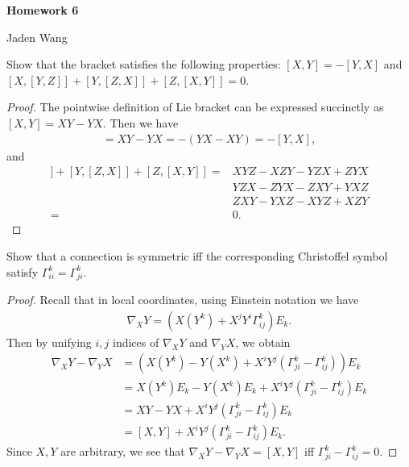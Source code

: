 \documentclass[12pt]{article}
\begin{document}
\centerline {\textsf{\textbf{\LARGE{Homework 6}}}}
\centerline {Jaden Wang}
\vspace{.15in}
\begin{problem}[LN15 0.4]
	Show that the bracket satisfies the following properties: $ [X,Y] = - [Y,X]$ and  $ [X,[Y,Z]] + [Y,[Z,X]] + [Z,[X,Y]] =0$.
\end{problem}
\begin{proof}
	The pointwise definition of Lie bracket can be expressed succinctly as $ [X,Y] = XY-YX$. Then we have
\begin{align*}
	[X,Y] = XY - YX = -(YX-XY) = - [Y,X],
\end{align*}
and
\begin{align*}
	[X,[Y,Z]] + [Y,[Z,X]] + [Z,[X,Y]] =& XYZ-XZY-YZX+ZYX \\
	& YZX- ZYX-ZXY+YXZ\\
	& ZXY - YXZ-XYZ + XZY\\
	=& 0 .
\end{align*}
\end{proof}
\begin{problem}[LN15 0.5]
Show that a connection is symmetric iff the corresponding Christoffel symbol satisfy $ \Gamma_{ii}^{k} = \Gamma_{ji}^{k}$.
\end{problem}
\begin{proof}
Recall that in local coordinates, using Einstein notation we have
\begin{align*}
	\nabla _XY = \left( X(Y^{k}) + X^{j} Y^{i} \Gamma_{ij}^{k} \right) E_k . 
\end{align*}
Then by unifying $ i,j$ indices of $ \nabla _X Y$ and $ \nabla _YX$, we obtain
\begin{align*}
	\nabla _XY - \nabla _YX &= \left( X(Y^{k}) - Y(X^{k}) + X^{i}Y^{j} \left( \Gamma_{ji}^{k} - \Gamma_{ij}^{k} \right)  \right) E_k \\
				&=X(Y^{k})E_k - Y(X^{k})E_k + X^{i}Y^{j} \left( \Gamma_{ji}^{k} - \Gamma_{ij}^{k} \right) E_k \\
				&=XY-YX + X^{i}Y^{j} \left( \Gamma_{ji}^{k} - \Gamma_{ij}^{k} \right) E_k \\
				&=[X,Y] + X^{i}Y^{j} \left( \Gamma_{ji}^{k} - \Gamma_{ij}^{k} \right) E_k .
\end{align*}
Since $ X,Y$ are arbitrary, we see that  $ \nabla _X Y- \nabla _YX = [X,Y]$ iff $ \Gamma_{ji}^{k} - \Gamma_{ij}^{k} = 0$.
\end{proof}
\begin{problem}[do Carmo 3.1]

\end{problem}
\end{document}
